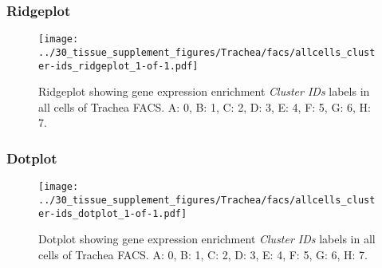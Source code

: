 \clearpage

\subsubsection{Ridgeplot}
\begin{figure}[h]
\centering
\texttt{[image: ../30\_tissue\_supplement\_figures/Trachea/facs/allcells\_cluster-ids\_ridgeplot\_1-of-1.pdf]}

\caption{ Ridgeplot  showing gene expression enrichment \emph{Cluster IDs} labels in all cells of Trachea FACS. A: 0, B: 1, C: 2, D: 3, E: 4, F: 5, G: 6, H: 7.}
\end{figure}


\clearpage

\subsubsection{Dotplot}
\begin{figure}[h]
\centering
\texttt{[image: ../30\_tissue\_supplement\_figures/Trachea/facs/allcells\_cluster-ids\_dotplot\_1-of-1.pdf]}

\caption{ Dotplot  showing gene expression enrichment \emph{Cluster IDs} labels in all cells of Trachea FACS. A: 0, B: 1, C: 2, D: 3, E: 4, F: 5, G: 6, H: 7.}
\end{figure}

